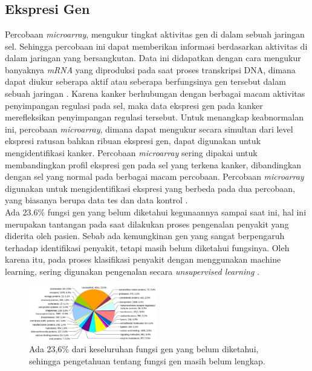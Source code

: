 \chapter{\babDua}

\section{Ekspresi Gen}
Percobaan \textit{microarray}, mengukur tingkat aktivitas gen di dalam sebuah jaringan sel. Sehingga percobaan ini dapat memberikan informasi berdasarkan aktivitas di dalam jaringan yang bersangkutan. Data ini didapatkan dengan cara mengukur banyaknya \textit{mRNA} yang diproduksi pada saat proses transkripsi DNA, dimana dapat diukur seberapa aktif atau seberapa berfungsinya gen tersebut dalam sebuah jaringan \citep{elloumi2011algorithms}. Karena kanker berhubungan dengan berbagai macam aktivitas penyimpangan regulasi pada sel, maka data ekspresi gen pada kanker merefleksikan penyimpangan regulasi tersebut. Untuk menangkap keabnormalan ini, percobaan \textit{microarray}, dimana dapat mengukur secara simultan dari level ekspresi ratusan bahkan ribuan ekspresi gen, dapat digunakan untuk mengidentifikasi kanker. Percobaan \textit{microarray} sering dipakai untuk membandingkan profil ekspresi gen pada sel yang terkena kanker, dibandingkan dengan sel yang normal pada berbagai macam percobaan. Percobaan \textit{microarray} digunakan untuk mengidentifikasi ekspresi yang berbeda pada dua percobaan, yang biasanya berupa data tes dan data kontrol \citep{elloumi2011algorithms}. \\
Ada 23.6\% fungsi gen yang belum diketahui kegunaannya sampai saat ini, hal ini merupakan tantangan pada saat dilakukan proses pengenalan penyakit yang diderita oleh pasien. Sebab ada kemungkinan gen yang sangat berpengaruh terhadap identifikasi penyakit, tetapi masih belum diketahui fungsinya. Oleh karena itu, pada proses klasifikasi penyakit dengan menggunakan machine learning, sering digunakan pengenalan secara \textit{unsupervised learning} \citep{haggstrom2014diagram}. \\
\begin{figure}
	\centering
	\includegraphics[width=0.50\textwidth]
		{pics/gbr2_1.png}
	\caption{Ada 23,6\% dari keseluruhan fungsi gen yang belum diketahui, sehingga pengetahuan tentang fungsi gen masih belum lengkap. \citep{haggstrom2014diagram}}
	\label{fig:gbr2.1}
\end{figure}

